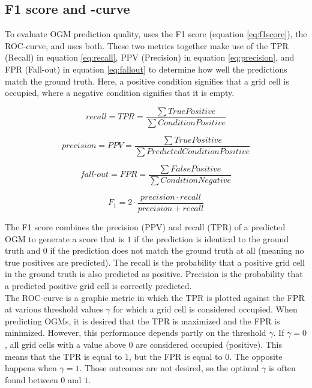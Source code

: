 \subsection{F1 score and -curve} \label{subsec:froc_met}
To evaluate \gls{OGM} prediction quality, \cite{dequaire2018deep} uses the F1 score (equation \ref{eq:f1score}), \cite{hoermann2018dynamic} the \gls{ROC}-curve, and \cite{schreiber2019long} uses both. These two metrics together make use of the \gls{TPR} (Recall) in equation \ref{eq:recall}, \gls{PPV} (Precision) in equation \ref{eq:precision}, and \gls{FPR} (Fall-out) in equation \ref{eq:fallout} to determine how well the predictions match the ground truth. Here, a positive condition signifies that a grid cell is occupied, where a negative condition signifies that it is empty.

\begin{equation} \label{eq:recall}
	recall = TPR = \frac{\sum True Positive}{\sum Condition Positive}
\end{equation}

\begin{equation} \label{eq:precision}
	precision = PPV = \frac{\sum True Positive}{\sum Predicted Condition Positive}
\end{equation}

\begin{equation} \label{eq:fallout}
	fall\text{-}out = FPR = \frac{\sum False Positive}{\sum Condition Negative}
\end{equation}

\begin{equation} \label{eq:f1score}
	F_1 = 2 \cdot \frac{precision \cdot recall}{precision + recall}
\end{equation}

The F1 score combines the precision (\gls{PPV}) and recall (\gls{TPR}) of a predicted \gls{OGM} to generate a score that is $1$ if the prediction is identical to the ground truth and $0$ if the prediction does not match the ground truth at all (meaning no true positives are predicted). The recall is the probability that a positive grid cell in the ground truth is also predicted as positive. Precision is the probability that a predicted positive grid cell is correctly predicted. \\

The \gls{ROC}-curve is a graphic metric in which the \gls{TPR} is plotted against the \gls{FPR} at various threshold values $\gamma$ for which a grid cell is considered occupied. When predicting \glspl{OGM}, it is desired that the \gls{TPR} is maximized and the \gls{FPR} is minimized. However, this performance depends partly on the threshold $\gamma$. If $\gamma = 0$, all grid cells with a value above $0$ are considered occupied (positive). This means that the \gls{TPR} is equal to $1$, but the \gls{FPR} is equal to $0$. The opposite happens when $\gamma = 1$. Those outcomes are not desired, so the optimal $\gamma$ is often found between $0$ and $1$.  \\

